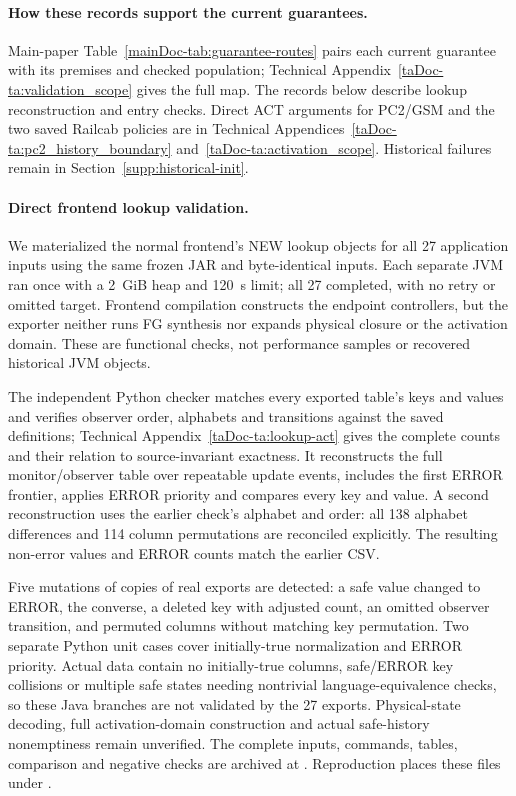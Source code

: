 \documentclass[11pt]{article}
\begin{document}
\paragraph{How these records support the current guarantees.}
Main-paper Table~\ref{mainDoc-tab:guarantee-routes} pairs each current guarantee with its premises and checked population; Technical Appendix~\ref{taDoc-ta:validation_scope} gives the full map. The records below describe lookup reconstruction and entry checks. Direct ACT arguments for PC2/GSM and the two saved Railcab policies are in Technical Appendices~\ref{taDoc-ta:pc2_history_boundary} and~\ref{taDoc-ta:activation_scope}. Historical failures remain in Section~\ref{supp:historical-init}.

\paragraph{Direct frontend lookup validation.}
We materialized the normal frontend's NEW lookup objects for all 27 application inputs using the same frozen JAR and byte-identical inputs. Each separate JVM ran once with a 2~GiB heap and 120~s limit; all 27 completed, with no retry or omitted target. Frontend compilation constructs the endpoint controllers, but the exporter neither runs FG synthesis nor expands physical closure or the activation domain. These are functional checks, not performance samples or recovered historical JVM objects.

The independent Python checker matches every exported table's keys and values and verifies observer order, alphabets and transitions against the saved definitions; Technical Appendix~\ref{taDoc-ta:lookup-act} gives the complete counts and their relation to source-invariant exactness. It reconstructs the full monitor/observer table over repeatable update events, includes the first ERROR frontier, applies ERROR priority and compares every key and value. A second reconstruction uses the earlier check's alphabet and order: all 138 alphabet differences and 114 column permutations are reconciled explicitly. The resulting non-error values and ERROR counts match the earlier CSV.

Five mutations of copies of real exports are detected: a safe value changed to ERROR, the converse, a deleted key with adjusted count, an omitted observer transition, and permuted columns without matching key permutation. Two separate Python unit cases cover initially-true normalization and ERROR priority. Actual data contain no initially-true columns, safe/ERROR key collisions or multiple safe states needing nontrivial language-equivalence checks, so these Java branches are not validated by the 27 exports. Physical-state decoding, full activation-domain construction and actual safe-history nonemptiness remain unverified. The complete inputs, commands, tables, comparison and negative checks are archived at . Reproduction places these files under .
\end{document}
